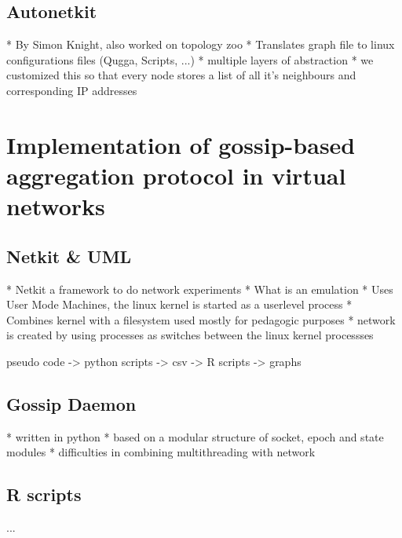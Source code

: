 \documentclass[11pt,a4paper]{article}
\begin{document}
\subsection{Autonetkit}
* By Simon Knight, also worked on topology zoo
* Translates graph file to linux configurations files (Qugga, Scripts, ...)
* multiple layers of abstraction
* we customized this so that every node stores a list of all it's neighbours and corresponding IP addresses

\section{Implementation of gossip-based aggregation protocol in virtual networks}
\subsection{Netkit & UML}
* Netkit a framework to do network experiments
* What is an emulation
* Uses User Mode Machines, the linux kernel is started as a userlevel process
* Combines kernel with a filesystem used mostly for pedagogic purposes
* network is created by using processes as switches between the linux kernel processses

pseudo code -> python scripts -> csv -> R scripts -> graphs
\subsection{Gossip Daemon}
* written in python
* based on a modular structure of socket, epoch and state modules
* difficulties in combining multithreading with network

\subsection{R scripts}
...
\end{document}
